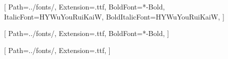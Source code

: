 [%
    Path=../fonts/,
    Extension=.ttf,
    BoldFont=*-Bold,
    ItalicFont=HYWuYouRuiKaiW,
    BoldItalicFont=HYWuYouRuiKaiW,
]

[%
    Path=../fonts/,
    Extension=.ttf,
    BoldFont=*-Bold,
]

[
    Path=../fonts/,
    Extension=.ttf,
]
